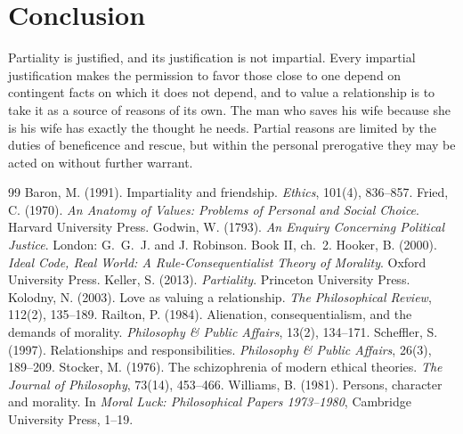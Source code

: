 \documentclass{situationist-preprint}
\begin{document}
\section{Conclusion}

Partiality is justified, and its justification is not impartial. Every impartial justification makes the permission to favor those close to one depend on contingent facts on which it does not depend, and to value a relationship is to take it as a source of reasons of its own. The man who saves his wife because she is his wife has exactly the thought he needs. Partial reasons are limited by the duties of beneficence and rescue, but within the personal prerogative they may be acted on without further warrant.

\begin{thebibliography}{99}\small
{} Baron, M. (1991). Impartiality and friendship. \emph{Ethics}, 101(4), 836--857.
 Fried, C. (1970). \emph{An Anatomy of Values: Problems of Personal and Social Choice}. Harvard University Press.
 Godwin, W. (1793). \emph{An Enquiry Concerning Political Justice}. London: G.~G.~J. and J. Robinson. Book II, ch.~2.
 Hooker, B. (2000). \emph{Ideal Code, Real World: A Rule-Consequentialist Theory of Morality}. Oxford University Press.
 Keller, S. (2013). \emph{Partiality}. Princeton University Press.
 Kolodny, N. (2003). Love as valuing a relationship. \emph{The Philosophical Review}, 112(2), 135--189.
 Railton, P. (1984). Alienation, consequentialism, and the demands of morality. \emph{Philosophy \& Public Affairs}, 13(2), 134--171.
 Scheffler, S. (1997). Relationships and responsibilities. \emph{Philosophy \& Public Affairs}, 26(3), 189--209.
 Stocker, M. (1976). The schizophrenia of modern ethical theories. \emph{The Journal of Philosophy}, 73(14), 453--466.
 Williams, B. (1981). Persons, character and morality. In \emph{Moral Luck: Philosophical Papers 1973--1980}, Cambridge University Press, 1--19.
\end{thebibliography}
\end{document}
